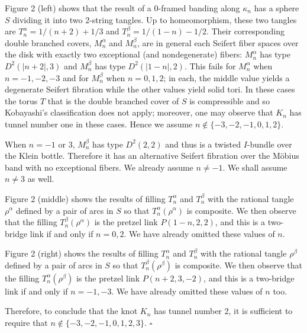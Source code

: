\documentclass[11pt]{article}
\begin{document}
Figure 2 (left) shows that the result of a 0-framed banding along $\kappa_n$ has a sphere $S$ dividing
it into two 2-string tangles. Up to homeomorphism, these two tangles are $T_n^\alpha = 1/(n+2)+1/3$
and $T_n^\beta = 1/(1-n)-1/2$. Their corresponding double branched covers, $M_n^\alpha$ and
$M_n^\beta$, are in general each Seifert fiber spaces over the disk with exactly two exceptional (and
nondegenerate) fibers: $M_n^\alpha$ has type $D^2(|n+2|,3)$ and $M_n^\beta$ has type $D^2(|1-n|,2)$.
This fails for $M_n^\alpha$ when $n=-1,-2,-3$ and for $M_n^\beta$ when $n=0,1,2$; in each, the middle
value yields a degenerate Seifert fibration while the other values yield solid tori. In these cases
the torus $T$ that is the double branched cover of $S$ is compressible and so Kobayashi's
classification does not apply; moreover, one may observe that $K_n$ has tunnel number one in these
cases. Hence we assume $n\notin\{-3,-2,-1,0,1,2\}$.

When $n=-1$ or $3$, $M_n^\beta$ has type $D^2(2,2)$ and thus is a twisted $I$-bundle over the Klein
bottle. Therefore it has an alternative Seifert fibration over the M\"obius band with no exceptional
fibers. We already assume $n\neq -1$. We shall assume $n\neq 3$ as well.

Figure 2 (middle) shows the results of filling $T_n^\alpha$ and $T_n^\beta$ with the rational tangle
$\rho^\alpha$ defined by a pair of arcs in $S$ so that $T_n^\alpha(\rho^\alpha)$ is composite. We then
observe that the filling $T_n^\beta(\rho^\alpha)$ is the pretzel link $P(1-n,2,2)$, and this is a
two-bridge link if and only if $n=0,2$. We have already omitted these values of $n$.

Figure 2 (right) shows the results of filling $T_n^\alpha$ and $T_n^\beta$ with the rational tangle
$\rho^\beta$ defined by a pair of arcs in $S$ so that $T_n^\beta(\rho^\beta)$ is composite. We then
observe that the filling $T_n^\alpha(\rho^\beta)$ is the pretzel link $P(n+2,3,-2)$, and this is a
two-bridge link if and only if $n=-1,-3$. We have already omitted these values of $n$ too.

Therefore, to conclude that the knot $K_n$ has tunnel number 2, it is sufficient to require that
$n\notin\{-3,-2,-1,0,1,2,3\}$. \hfill$\square$
\end{document}
